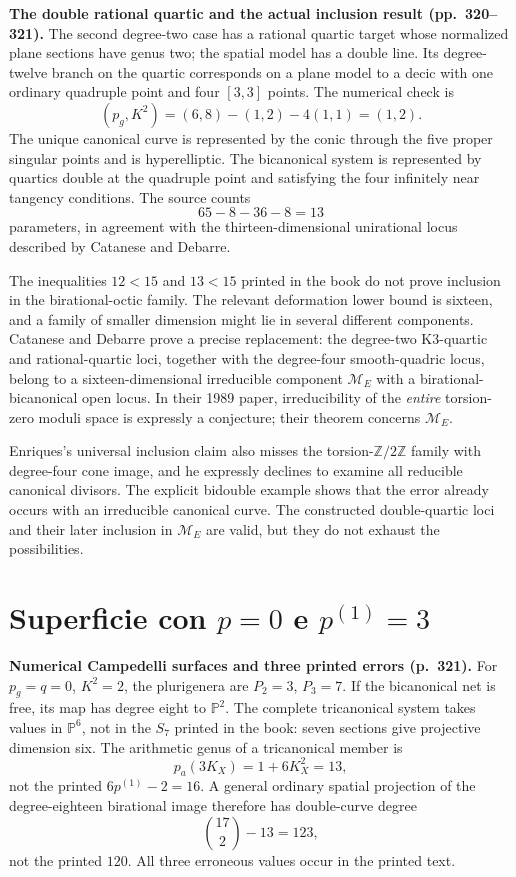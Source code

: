 \textbf{The double rational quartic and the actual inclusion result (pp.~320--321).}
The second degree-two case has a rational quartic target whose normalized plane sections have genus two; the spatial model has a double line. Its degree-twelve branch on the quartic corresponds on a plane model to a decic with one ordinary quadruple point and four \([3,3]\) points. The numerical check is
\[
(p_g,K^2)=(6,8)-(1,2)-4(1,1)=(1,2).
\]
The unique canonical curve is represented by the conic through the five proper singular points and is hyperelliptic. The bicanonical system is represented by quartics double at the quadruple point and satisfying the four infinitely near tangency conditions. The source counts
\[
65-8-36-8=13
\]
parameters, in agreement with the thirteen-dimensional unirational locus described by Catanese and Debarre.

The inequalities \(12<15\) and \(13<15\) printed in the book do not prove inclusion in the birational-octic family. The relevant deformation lower bound is sixteen, and a family of smaller dimension might lie in several different components. Catanese and Debarre prove a precise replacement: the degree-two K3-quartic and rational-quartic loci, together with the degree-four smooth-quadric locus, belong to a sixteen-dimensional irreducible component \(\mathcal M_E\) with a birational-bicanonical open locus. In their 1989 paper, irreducibility of the \emph{entire} torsion-zero moduli space is expressly a conjecture; their theorem concerns \(\mathcal M_E\).

Enriques's universal inclusion claim also misses the torsion-\(\mathbb Z/2\mathbb Z\) family with degree-four cone image, and he expressly declines to examine all reducible canonical divisors. The explicit bidouble example shows that the error already occurs with an irreducible canonical curve. The constructed double-quartic loci and their later inclusion in \(\mathcal M_E\) are valid, but they do not exhaust the possibilities.

\section{Superficie con \texorpdfstring{$p=0$}{p=0} e \texorpdfstring{$p^{(1)}=3$}{p(1)=3}}
\label{cp2-viii-20}

\textbf{Numerical Campedelli surfaces and three printed errors (p.~321).}
For \(p_g=q=0\), \(K^2=2\), the plurigenera are \(P_2=3\), \(P_3=7\). If the bicanonical net is free, its map has degree eight to \(\mathbb P^2\). The complete tricanonical system takes values in \(\mathbb P^6\), not in the \(S_7\) printed in the book: seven sections give projective dimension six. The arithmetic genus of a tricanonical member is
\[
p_a(3K_X)=1+6K_X^2=13,
\]
not the printed \(6p^{(1)}-2=16\). A general ordinary spatial projection of the degree-eighteen birational image therefore has double-curve degree
\[
\binom{17}{2}-13=123,
\]
not the printed \(120\). All three erroneous values occur in the printed text.

